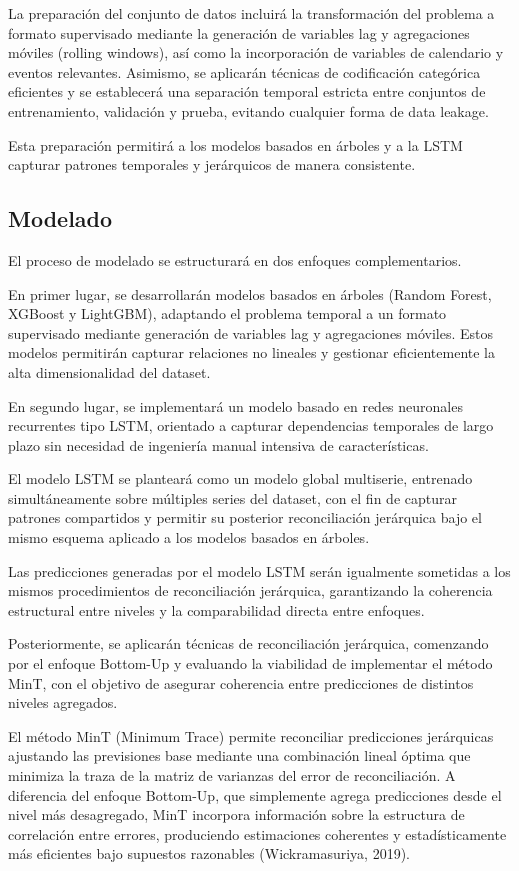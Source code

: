 \documentclass[IB,BIB]{TFUOC}%
\begin{document}
La preparación del conjunto de datos incluirá la transformación del
problema a formato supervisado mediante la generación de variables lag y
agregaciones móviles (rolling windows), así como la incorporación de
variables de calendario y eventos relevantes. Asimismo, se aplicarán
técnicas de codificación categórica eficientes y se establecerá una
separación temporal estricta entre conjuntos de entrenamiento,
validación y prueba, evitando cualquier forma de data leakage.

Esta preparación permitirá a los modelos basados en árboles y a la LSTM
capturar patrones temporales y jerárquicos de manera consistente.

\subsection{Modelado}

El proceso de modelado se estructurará en dos enfoques complementarios.

En primer lugar, se desarrollarán modelos basados en árboles (Random
Forest, XGBoost y LightGBM), adaptando el problema temporal a un formato
supervisado mediante generación de variables lag y agregaciones móviles.
Estos modelos permitirán capturar relaciones no lineales y gestionar
eficientemente la alta dimensionalidad del dataset.

En segundo lugar, se implementará un modelo basado en redes neuronales
recurrentes tipo LSTM, orientado a capturar dependencias temporales de
largo plazo sin necesidad de ingeniería manual intensiva de
características.

El modelo LSTM se planteará como un modelo global multiserie, entrenado
simultáneamente sobre múltiples series del dataset, con el fin de
capturar patrones compartidos y permitir su posterior reconciliación
jerárquica bajo el mismo esquema aplicado a los modelos basados en
árboles.

Las predicciones generadas por el modelo LSTM serán igualmente sometidas
a los mismos procedimientos de reconciliación jerárquica, garantizando
la coherencia estructural entre niveles y la comparabilidad directa
entre enfoques.

Posteriormente, se aplicarán técnicas de reconciliación jerárquica,
comenzando por el enfoque Bottom-Up y evaluando la viabilidad de
implementar el método MinT, con el objetivo de asegurar coherencia entre
predicciones de distintos niveles agregados.

El método MinT (Minimum Trace) permite reconciliar predicciones
jerárquicas ajustando las previsiones base mediante una combinación
lineal óptima que minimiza la traza de la matriz de varianzas del error
de reconciliación. A diferencia del enfoque Bottom-Up, que simplemente
agrega predicciones desde el nivel más desagregado, MinT incorpora
información sobre la estructura de correlación entre errores,
produciendo estimaciones coherentes y estadísticamente más eficientes
bajo supuestos razonables (Wickramasuriya, 2019).
\end{document}

